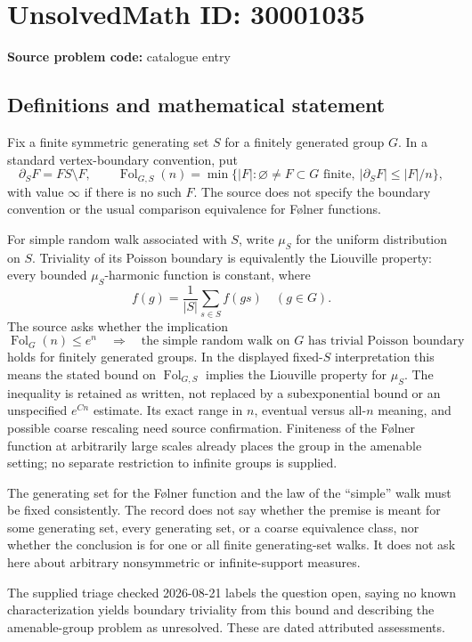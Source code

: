 \documentclass[11pt]{article}
\begin{document}
\section*{UnsolvedMath ID: 30001035}
\textbf{Source problem code:} catalogue entry
\subsection{Definitions and mathematical statement}
Fix a finite symmetric generating set $S$ for a finitely generated group $G$. In a standard vertex-boundary convention, put
\[
\partial_S F=FS\setminus F,\qquad
\operatorname{Fol}_{G,S}(n)=\min\{|F|:\varnothing\ne F\subset G\text{ finite},\ |\partial_SF|\leq |F|/n\},
\]
with value $\infty$ if there is no such $F$. The source does not specify the boundary convention or the usual comparison equivalence for Følner functions.

For simple random walk associated with $S$, write $\mu_S$ for the uniform distribution on $S$. Triviality of its Poisson boundary is equivalently the Liouville property: every bounded $\mu_S$-harmonic function is constant, where
\[
f(g)=\frac1{|S|}\sum_{s\in S}f(gs)\quad(g\in G).
\]
The source asks whether the implication
\[
\operatorname{Fol}_{G}(n)\leq e^n
\quad\Longrightarrow\quad
\text{the simple random walk on }G\text{ has trivial Poisson boundary}
\]
holds for finitely generated groups. In the displayed fixed-$S$ interpretation this means the stated bound on $\operatorname{Fol}_{G,S}$ implies the Liouville property for $\mu_S$. The inequality is retained as written, not replaced by a subexponential bound or an unspecified $e^{Cn}$ estimate. Its exact range in $n$, eventual versus all-$n$ meaning, and possible coarse rescaling need source confirmation. Finiteness of the Følner function at arbitrarily large scales already places the group in the amenable setting; no separate restriction to infinite groups is supplied.

The generating set for the Følner function and the law of the ``simple'' walk must be fixed consistently. The record does not say whether the premise is meant for some generating set, every generating set, or a coarse equivalence class, nor whether the conclusion is for one or all finite generating-set walks. It does not ask here about arbitrary nonsymmetric or infinite-support measures.

The supplied triage checked 2026-08-21 labels the question open, saying no known characterization yields boundary triviality from this bound and describing the amenable-group problem as unresolved. These are dated attributed assessments.
\end{document}
